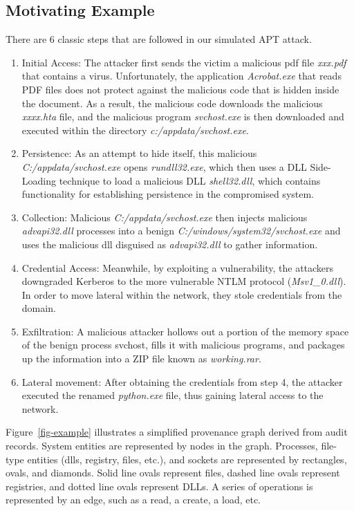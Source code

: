 \subsection{Motivating Example}
There are 6 classic steps that are followed in our simulated APT attack.
\begin{enumerate}
    \item Initial Access: The attacker first sends the victim a malicious pdf file \textit{xxx.pdf} that contains a virus. Unfortunately, the application \textit{Acrobat.exe} that reads PDF files does not protect against the malicious code that is hidden inside the document. As a result, the malicious code downloads the malicious \textit{xxxx.hta} file, and the malicious program \textit{svchost.exe} is then downloaded and executed within the directory \textit{c:/appdata/svchost.exe}. 
    \item Persistence: As an attempt to hide itself, this malicious \textit{C:/appdata/svchost.exe} opens \textit{rundll32.exe}, which then uses a DLL Side-Loading technique to load a malicious DLL \textit{shell32.dll}, which contains functionality for establishing persistence in the compromised system.
    \item Collection: Malicious \textit{C:/appdata/svchost.exe} then injects malicious \textit{advapi32.dll} processes into a benign \textit{C:/windows/system32/svchost.exe} and uses the malicious dll disguised as \textit{advapi32.dll} to gather information.
    \item Credential Access: Meanwhile, by exploiting a vulnerability, the attackers downgraded Kerberos to the more vulnerable NTLM protocol (\textit{Msv1\_0.dll}). In order to move lateral within the network, they stole credentials from the domain. 
    \item Exfiltration: A malicious attacker hollows out a portion of the memory space of the benign process svchost, fills it with malicious programs, and packages up the information into a ZIP file known as \textit{working.rar}.
    \item Lateral movement: After obtaining the credentials from step 4, the attacker executed the renamed \textit{python.exe} file, thus gaining lateral access to the network.
\end{enumerate}

Figure~\ref{fig-example} illustrates a simplified provenance graph derived from audit records. System entities are represented by nodes in the graph. Processes, file-type entities (dlls, registry, files, etc.), and sockets are represented by rectangles, ovals, and diamonds. Solid line ovals represent files, dashed line ovals represent registries, and dotted line ovals represent DLLs.
A series of operations is represented by an edge, such as a read, a create, a load, etc.


